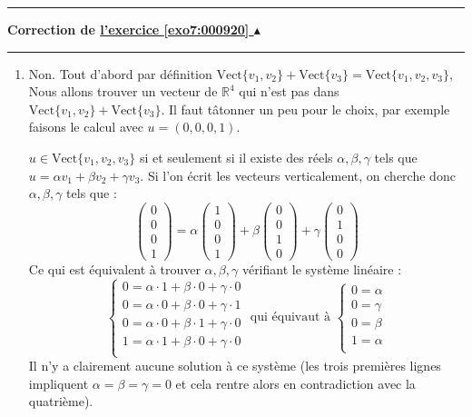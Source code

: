 \documentclass[11pt,a4paper]{article}
\newcommand{\Rr}{\mathbb{R}} \newcommand{\R}{\mathbb{R}}
\newcounter{exo}
\newcommand{\correction}[1]{\hypertarget{cor7:#1}{}\label{cor7:#1}{\bf Correction de \hyperlink{exo7:#1}{l'exercice \ref{exo7:#1} $\blacktriangle$}}\vspace{1mm}\hrule\vspace{1mm}}
\newcommand{\fincorrection}{\vspace{1mm}\hrule\vspace*{7mm}}
\begin{document}
\fincorrection
\correction{000920}
\begin{enumerate}
\item Non. 
Tout d'abord par définition
$\text{Vect}\{v_1,v_2\}+\text{Vect}\{v_3\} = \text{Vect}\{v_1,v_2,v_3\}$,
Nous allons trouver un vecteur de $\Rr^4$ qui n'est pas dans 
$\text{Vect}\{v_1,v_2\}+\text{Vect}\{v_3\}$.
Il faut tâtonner un peu pour le choix, par exemple faisons le calcul avec $u=(0,0,0,1)$.

$u \in \text{Vect}\{v_1,v_2,v_3\}$ si et seulement si 
il existe des réels $\alpha,\beta,\gamma$ tels que $u=\alpha v_1 + \beta v_2 + \gamma v_3$.
Si l'on écrit les vecteurs verticalement, on cherche donc $\alpha,\beta,\gamma$ tels que :
$$\begin{pmatrix} 0 \\ 0 \\ 0 \\1\end{pmatrix}= \alpha \begin{pmatrix} 1 \\ 0 \\ 0 \\1\end{pmatrix}
+ \beta \begin{pmatrix} 0 \\ 0 \\ 1 \\ 0 \end{pmatrix}+\gamma\begin{pmatrix} 0 \\ 1 \\ 0 \\0\end{pmatrix}$$
Ce qui est équivalent à trouver $\alpha,\beta,\gamma$ vérifiant le système linéaire :
$$\begin{cases}
0 = \alpha \cdot 1 + \beta \cdot 0 + \gamma \cdot 0   \\
0 = \alpha \cdot 0 + \beta \cdot 0 + \gamma \cdot 1   \\
0 = \alpha \cdot 0 + \beta \cdot 1 + \gamma \cdot 0   \\
1 = \alpha \cdot 1 + \beta \cdot 0 + \gamma \cdot 0   \\
\end{cases}
\text{ qui équivaut à } 
\begin{cases}
0 = \alpha \\
0 = \gamma \\
0 = \beta  \\
1 = \alpha \\
\end{cases}
$$
Il n'y a clairement aucune solution à ce système (les trois premières lignes impliquent $\alpha=\beta=\gamma=0$
et cela rentre alors en contradiction avec la quatrième).


\end{enumerate}
\end{document}
